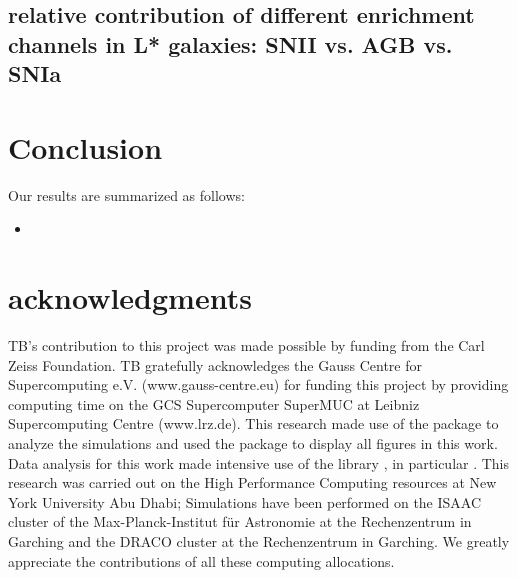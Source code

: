 \documentclass[useAMS,usenatbib]{mnras}
\begin{document}
\subsection{relative contribution of different enrichment channels in L* galaxies: SNII vs. AGB vs. SNIa}


\section{Conclusion}
\label{sec:conclusion}



Our results are summarized as follows:
\begin{itemize}
%
\item 

\end{itemize}



\section*{acknowledgments}
TB's contribution to this project was made possible by funding from the Carl Zeiss Foundation. TB gratefully acknowledges the Gauss Centre for Supercomputing e.V. (www.gauss-centre.eu) for funding this project by providing computing time on the GCS Supercomputer SuperMUC at Leibniz Supercomputing Centre (www.lrz.de).
This research made use of the {} \citet{pynbody} package to analyze the simulations and used the {} package {} \citep{matplotlib} to display all figures in this work. Data analysis for this work made intensive use of the {} library {} \citep{scipy}, in particular {} \citep{numpy,ipython}.
This research was carried out on the High Performance Computing resources at New York University Abu Dhabi; Simulations have been performed on the ISAAC cluster of the Max-Planck-Institut f\"ur Astronomie at the Rechenzentrum in Garching and the DRACO cluster at the Rechenzentrum in Garching. We greatly appreciate the contributions of all these computing allocations.
\end{document}
